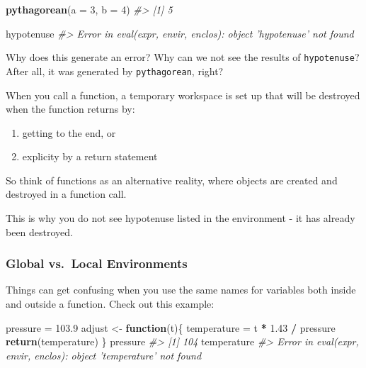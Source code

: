 \documentclass[]{book}
\newenvironment{Shaded}{\begin{snugshade}}{\end{snugshade}}
\newcommand{\KeywordTok}[1]{\textcolor[rgb]{0.13,0.29,0.53}{\textbf{#1}}}
\newcommand{\DataTypeTok}[1]{\textcolor[rgb]{0.13,0.29,0.53}{#1}}
\newcommand{\DecValTok}[1]{\textcolor[rgb]{0.00,0.00,0.81}{#1}}
\newcommand{\FloatTok}[1]{\textcolor[rgb]{0.00,0.00,0.81}{#1}}
\newcommand{\StringTok}[1]{\textcolor[rgb]{0.31,0.60,0.02}{#1}}
\newcommand{\CommentTok}[1]{\textcolor[rgb]{0.56,0.35,0.01}{\textit{#1}}}
\newcommand{\ControlFlowTok}[1]{\textcolor[rgb]{0.13,0.29,0.53}{\textbf{#1}}}
\newcommand{\OperatorTok}[1]{\textcolor[rgb]{0.81,0.36,0.00}{\textbf{#1}}}
\newcommand{\NormalTok}[1]{#1}
\providecommand{\tightlist}{%
  \setlength{\itemsep}{0pt}\setlength{\parskip}{0pt}}
\begin{document}
\begin{Shaded}
\begin{Highlighting}[]
\KeywordTok{pythagorean}\NormalTok{(}\DataTypeTok{a =} \DecValTok{3}\NormalTok{, }\DataTypeTok{b =} \DecValTok{4}\NormalTok{)}
\CommentTok{#> [1] 5}

\NormalTok{hypotenuse}
\CommentTok{#> Error in eval(expr, envir, enclos): object 'hypotenuse' not found}
\end{Highlighting}
\end{Shaded}

Why does this generate an error? Why can we not see the results of
\texttt{hypotenuse}? After all, it was generated by
\texttt{pythagorean}, right?

When you call a function, a temporary workspace is set up that will be
destroyed when the function returns by:

\begin{enumerate}
\def\labelenumi{\arabic{enumi}.}
\tightlist
\item
  getting to the end, or
\item
  explicity by a return statement
\end{enumerate}

So think of functions as an alternative reality, where objects are
created and destroyed in a function call.

This is why you do not see hypotenuse listed in the environment - it has
already been destroyed.

\subsubsection*{Global vs.~Local
Environments}\label{global-vs.local-environments}

Things can get confusing when you use the same names for variables both
inside and outside a function. Check out this example:

\begin{Shaded}
\begin{Highlighting}[]
\NormalTok{pressure =}\StringTok{ }\FloatTok{103.9}
\NormalTok{adjust <-}\StringTok{ }\ControlFlowTok{function}\NormalTok{(t)\{}
\NormalTok{    temperature =}\StringTok{ }\NormalTok{t }\OperatorTok{*}\StringTok{ }\FloatTok{1.43} \OperatorTok{/}\StringTok{ }\NormalTok{pressure}
    \KeywordTok{return}\NormalTok{(temperature)}
\NormalTok{\}}
\NormalTok{pressure}
\CommentTok{#> [1] 104}
\NormalTok{temperature}
\CommentTok{#> Error in eval(expr, envir, enclos): object 'temperature' not found}
\end{Highlighting}
\end{Shaded}
\end{document}
